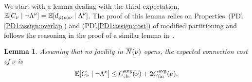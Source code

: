 \documentclass[oneside,final]{ucr}
\newtheorem{lemma}[theorem]{Lemma}
\begin{document}
We start with a lemma dealing with the third expectation,
$\mathbb{E}[C_\nu\mid\neg \Lambda^{\nu}] = \mathbb{E}[d_{\phi(\kappa)\nu} \mid
\Lambda^{\nu}]$. The proof of this lemma relies on
Properties~(PD'.\ref{PD1:assign:overlap}) and
(PD'.\ref{PD1:assign:cost}) of modified partitioning and follows the
reasoning in the proof of a similar lemma
in~\cite{ByrkaGS10,ByrkaA10}.


\begin{lemma}\label{lem: EBGS target connection cost}
Assuming that no facility in ${\overline{N}}(\nu)$ opens, the expected connection
cost of $\nu$ is
%
\begin{equation}
  \mathbb{E}[C_{\nu} \mid \neg \Lambda^{\nu}] \leq
  C_{{\mbox{\scriptsize\rm cls}}}^{{\mbox{\scriptsize\rm avg}}}(\nu) + 2C_{{\mbox{\scriptsize\rm far}}}^{{\mbox{\scriptsize\rm avg}}}(\nu).
  \label{eqn: expected connection cost target facility}
\end{equation}
%
\end{lemma}
\end{document}

